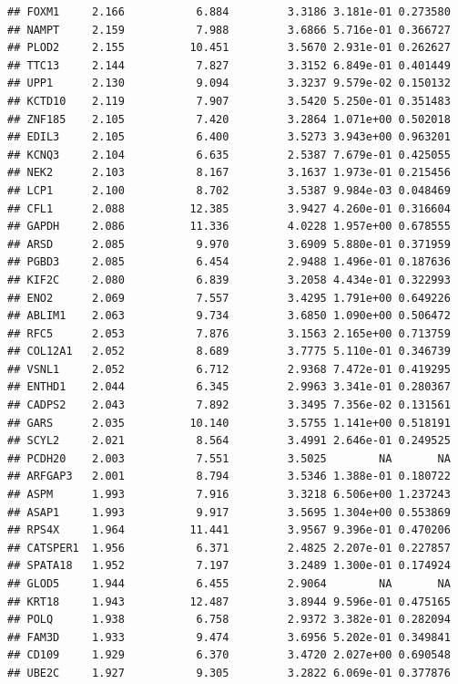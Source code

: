 \documentclass{article}\usepackage[]{graphicx}\usepackage[]{color}
\makeatletter
\newenvironment{kframe}{%
 \def\at@end@of@kframe{}%
 \ifinner\ifhmode%
  \def\at@end@of@kframe{\end{minipage}}%
  \begin{minipage}{\columnwidth}%
 \fi\fi%
 \def\FrameCommand##1{\hskip\@totalleftmargin \hskip-\fboxsep
 \colorbox{shadecolor}{##1}\hskip-\fboxsep
     \hskip-\linewidth \hskip-\@totalleftmargin \hskip\columnwidth}%
 \MakeFramed {\advance\hsize-\width
   \@totalleftmargin\z@ \linewidth\hsize
   \@setminipage}}%
 {\par\unskip\endMakeFramed%
 \at@end@of@kframe}
\newenvironment{knitrout}{}{} %
\makeatother
\begin{document}
\begin{knitrout}
\begin{kframe}
\begin{verbatim}
## FOXM1     2.166           6.884         3.3186 3.181e-01 0.273580
## NAMPT     2.159           7.988         3.6866 5.716e-01 0.366727
## PLOD2     2.155          10.451         3.5670 2.931e-01 0.262627
## TTC13     2.144           7.827         3.3152 6.849e-01 0.401449
## UPP1      2.130           9.094         3.3237 9.579e-02 0.150132
## KCTD10    2.119           7.907         3.5420 5.250e-01 0.351483
## ZNF185    2.105           7.420         3.2864 1.071e+00 0.502018
## EDIL3     2.105           6.400         3.5273 3.943e+00 0.963201
## KCNQ3     2.104           6.635         2.5387 7.679e-01 0.425055
## NEK2      2.103           8.167         3.1637 1.973e-01 0.215456
## LCP1      2.100           8.702         3.5387 9.984e-03 0.048469
## CFL1      2.088          12.385         3.9427 4.260e-01 0.316604
## GAPDH     2.086          11.336         4.0228 1.957e+00 0.678555
## ARSD      2.085           9.970         3.6909 5.880e-01 0.371959
## PGBD3     2.085           6.454         2.9488 1.496e-01 0.187636
## KIF2C     2.080           6.839         3.2058 4.434e-01 0.322993
## ENO2      2.069           7.557         3.4295 1.791e+00 0.649226
## ABLIM1    2.063           9.734         3.6850 1.090e+00 0.506472
## RFC5      2.053           7.876         3.1563 2.165e+00 0.713759
## COL12A1   2.052           8.689         3.7775 5.110e-01 0.346739
## VSNL1     2.052           6.712         2.9368 7.472e-01 0.419295
## ENTHD1    2.044           6.345         2.9963 3.341e-01 0.280367
## CADPS2    2.043           7.892         3.3495 7.356e-02 0.131561
## GARS      2.035          10.140         3.5755 1.141e+00 0.518191
## SCYL2     2.021           8.564         3.4991 2.646e-01 0.249525
## PCDH20    2.003           7.551         3.5025        NA       NA
## ARFGAP3   2.001           8.794         3.5346 1.388e-01 0.180722
## ASPM      1.993           7.916         3.3218 6.506e+00 1.237243
## ASAP1     1.993           9.917         3.5695 1.304e+00 0.553869
## RPS4X     1.964          11.441         3.9567 9.396e-01 0.470206
## CATSPER1  1.956           6.371         2.4825 2.207e-01 0.227857
## SPATA18   1.952           7.197         3.2489 1.300e-01 0.174924
## GLOD5     1.944           6.455         2.9064        NA       NA
## KRT18     1.943          12.487         3.8944 9.596e-01 0.475165
## POLQ      1.938           6.758         2.9372 3.382e-01 0.282094
## FAM3D     1.933           9.474         3.6956 5.202e-01 0.349841
## CD109     1.929           6.370         3.4720 2.027e+00 0.690548
## UBE2C     1.927           9.305         3.2822 6.069e-01 0.377876

\end{verbatim}
\end{kframe}
\end{knitrout}
\end{document}

